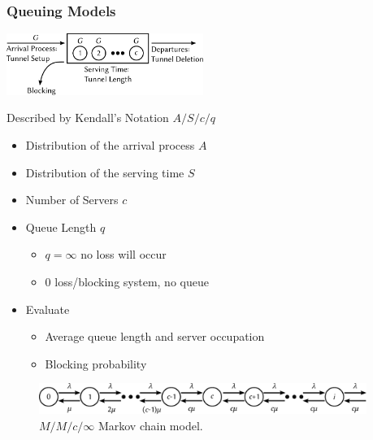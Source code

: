 \documentclass{beamer}
\begin{document}
\begin{frame}
	\frametitle{Queuing Models}
	\begin{center}
		\includegraphics[height=2cm]{../../chapters/041-mobilenetsmeasuring/images/GGn-model.pdf}
	\end{center}

	Described by Kendall's Notation $A/S/c/q$
	\begin{itemize}
	\item Distribution of the arrival process $A$
	\item Distribution of the serving time $S$
	\item Number of Servers $c$
	\item Queue Length $q$
	\begin{itemize}
		\item $q=\infty$ no loss will occur
		\item $0$ loss/blocking system, no queue
	\end{itemize}
	\item Evaluate
		\begin{itemize}
			\item Average queue length and server occupation
			\item Blocking probability
		\end{itemize}
	\end{itemize}
\end{frame}

\begin{frame}
	\begin{figure}
		\includegraphics[height=1cm]{../../chapters/041-mobilenetsmeasuring/images/markovchain.pdf}
		\caption{$M/M/c/\infty$ Markov chain model.}
	\end{figure}
\end{frame}
\end{document}
